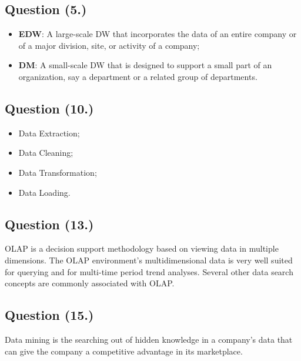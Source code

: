 		\subsection{Question (5.)}
			\begin{itemize}
				\item{\textbf{EDW}: A large-scale DW that incorporates the data of an entire company or of a major division, site, or activity of a company;}
				\item{\textbf{DM}: A small-scale DW that is designed to support a small part of an organization, say a department or a related group of departments.}
			\end{itemize}
		\subsection{Question (10.)}
			\begin{itemize}
				\item{Data Extraction;}
				\item{Data Cleaning;}
				\item{Data Transformation;}
				\item{Data Loading.}
			\end{itemize}

		\subsection{Question (13.)}
			OLAP is a decision support methodology based on viewing data in multiple dimensions. The OLAP environment's multidimensional data is very well suited for querying and for multi-time period trend analyses. Several other data search concepts are commonly associated with OLAP.

		\subsection{Question (15.)}
			Data mining is the searching out of hidden knowledge in a company's data that can give the company a competitive advantage in its marketplace.
